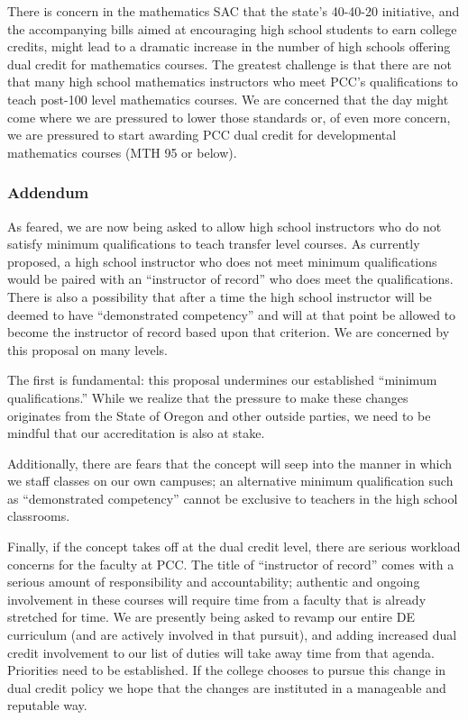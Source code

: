 There is concern in the mathematics SAC that the state's 40-40-20 initiative,
and the accompanying bills aimed at encouraging high school students to earn
college credits, might lead to a dramatic increase in the number of high
schools offering dual credit for mathematics courses. The greatest challenge is
that there are not that many high school mathematics instructors who meet PCC's
qualifications to teach post-100 level mathematics courses.  We are concerned
that the day might come where we are pressured to lower those standards or, of
even more concern, we are pressured to start awarding PCC dual credit for
developmental mathematics courses (MTH 95 or below).

\subsubsection{Addendum}
As feared, we are now being asked to allow high school instructors who do not satisfy minimum
qualifications to teach transfer level courses. As currently proposed, a high
school instructor who does not meet minimum qualifications would be paired with an ``instructor of record'' who does meet the qualifications.  There is also a possibility that after a time the high school instructor will be deemed to have ``demonstrated competency'' and will at that point be allowed to become the instructor of record based upon that criterion.  We are concerned by this proposal on many levels.

The first is fundamental: this proposal undermines our established ``minimum qualifications.''
While we realize that the pressure to make these changes originates from the State of Oregon and other outside parties, we
need to be mindful that our accreditation is also at stake.

Additionally, there are fears that the concept will seep into the manner in which we staff classes
on our own campuses; an alternative minimum qualification such as ``demonstrated competency''
cannot be exclusive to teachers in the high school classrooms.

Finally, if the concept takes off at the dual credit level, there are serious workload concerns
for the faculty at PCC. The title of ``instructor of record'' comes with a serious amount of
responsibility and accountability; authentic and ongoing involvement in these courses will
require time from a faculty that is already stretched for time. We are presently being asked
to revamp our entire DE curriculum (and are actively involved in that pursuit), and adding
increased dual credit involvement to our list of duties will take away time from that agenda.
Priorities need to be established. If the college chooses to pursue this change in dual credit
policy we hope that the changes are instituted in a manageable and reputable way.

